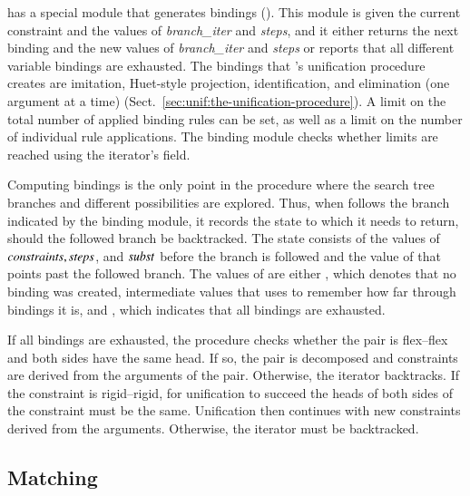 \ehohii{} has a special module that generates bindings (). This
module is given the current constraint and the values of \emph{branch\_iter} and
\emph{steps}, and it either returns the next binding and the new values of
\emph{branch\_iter} and \emph{steps} or reports that all different variable
bindings are exhausted. The bindings that \ehohii{}'s unification procedure creates
are imitation, Huet-style projection, identification, and elimination (one
argument at a time) (Sect.~\ref{sec:unif:the-unification-procedure}). A limit on the
total number of applied binding rules can be set, as well as a limit on the
number of individual rule applications. The binding module checks whether limits
are reached using the iterator's  field.

Computing bindings is the only point in the procedure where the search tree
branches and different possibilities are explored. Thus, when \ehohii{} follows
the branch indicated by the binding module, it records the state to which it
needs to return, should the followed branch be backtracked. The state consists of
the values
of $\mathit{constraints}, \mathit{steps}$, and $\mathit{subst}$ before the branch is followed
and the value of  that points past the followed branch. The
values of  are either , which denotes that no
binding was created, intermediate values that  uses to remember
how far through bindings it is, and , which indicates that all
bindings are exhausted.

If all bindings are exhausted, the procedure checks whether the pair is
flex--flex and both sides have the same head. If so, the pair is decomposed and
constraints are derived from the arguments of the pair. Otherwise, the iterator
backtracks.
%
If the constraint is rigid--rigid, for unification to succeed the heads of both
sides of the constraint must be the same. Unification then continues
with new constraints derived from the arguments. Otherwise, the iterator must be
backtracked.

\subsection{Matching} 


